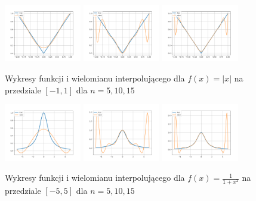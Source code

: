 \documentclass{article}
\begin{document}
\begin{figure}
\includegraphics[width=0.3\textwidth]{plots/6a_5.png}
\includegraphics[width=0.3\textwidth]{plots/6a_10.png}
\includegraphics[width=0.3\textwidth]{plots/6a_15.png}
\caption{Wykresy funkcji i wielomianu interpolującego dla $f(x) = |x|$ na przedziale $[-1,1]$ dla $n=5,10,15$}
\label{6a}
\end{figure}


\begin{figure}
\includegraphics[width=0.3\textwidth]{plots/6b_5.png}
\includegraphics[width=0.3\textwidth]{plots/6b_10.png}
\includegraphics[width=0.3\textwidth]{plots/6b_15.png}
\caption{Wykresy funkcji i wielomianu interpolującego dla $f(x) = \frac{1}{1+x^2}$ na przedziale $[-5,5]$ dla $n=5,10,15$}
\label{6b}
\end{figure}
\end{document}

